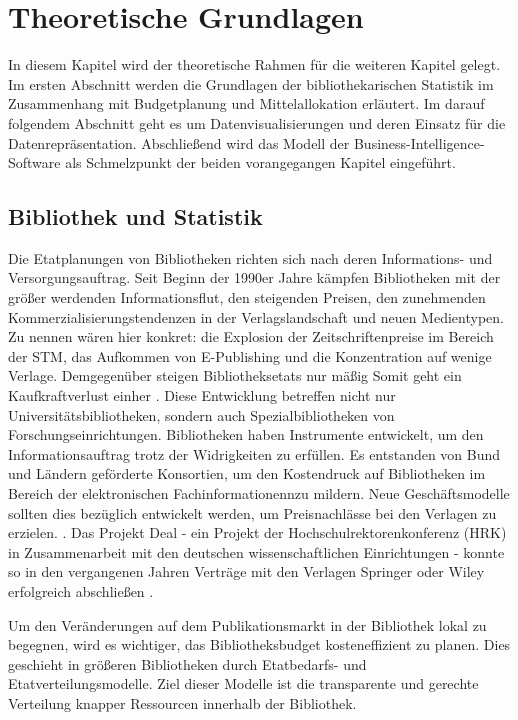 \chapter{Theoretische Grundlagen}
\label{chap:two}
In diesem Kapitel wird der theoretische Rahmen für die weiteren Kapitel gelegt. Im
ersten Abschnitt werden die Grundlagen der bibliothekarischen Statistik im Zusammenhang mit Budgetplanung
und Mittelallokation erläutert. Im darauf folgendem Abschnitt geht es um Datenvisualisierungen und deren Einsatz
für die Datenrepräsentation. Abschließend wird das Modell der Business-Intelligence-Software als Schmelzpunkt der 
beiden vorangegangen Kapitel eingeführt.

\section{Bibliothek und Statistik}
\label{chap:two_one}
Die Etatplanungen von Bibliotheken richten sich nach deren Informations- und Versorgungsauftrag. 
Seit Beginn der 1990er Jahre kämpfen Bibliotheken mit der größer werdenden Informationsflut, den steigenden Preisen, 
den zunehmenden Kommerzialisierungstendenzen in der Verlagslandschaft und neuen Medientypen. 
Zu nennen wären hier konkret: die Explosion der Zeitschriftenpreise im Bereich der \acrfull{STM},
das Aufkommen von E-Publishing und die Konzentration auf wenige Verlage. Demgegenüber steigen Bibliotheksetats nur mäßig
Somit geht ein Kaufkraftverlust einher \cite[vgl.][161]{moravetz-kuhlmann_monika_erwerbungspolitik_2015}.
Diese Entwicklung betreffen nicht nur Universitätsbibliotheken, sondern auch Spezialbibliotheken von Forschungseinrichtungen.
Bibliotheken haben Instrumente entwickelt, um den Informationsauftrag trotz der Widrigkeiten zu erfüllen.
Es entstanden von Bund und Ländern geförderte Konsortien, um den Kostendruck auf Bibliotheken im Bereich der elektronischen
Fachinformationennzu mildern. Neue Geschäftsmodelle sollten dies bezüglich entwickelt werden, um Preisnachlässe bei den Verlagen zu erzielen. 
\cite[vgl.][169 ff.]{moravetz-kuhlmann_monika_erwerbungspolitik_2015}. Das Projekt Deal - ein Projekt der Hochschulrektorenkonferenz (HRK) in Zusammenarbeit mit den
deutschen wissenschaftlichen Einrichtungen - konnte so in den vergangenen Jahren Verträge mit den Verlagen Springer oder Wiley erfolgreich abschließen \cite[vgl.][]{projekt_deal_projekt_2020}.


Um den Veränderungen auf dem Publikationsmarkt in der Bibliothek lokal zu begegnen, wird es wichtiger, das Bibliotheksbudget kosteneffizient zu planen. 
Dies geschieht in größeren Bibliotheken durch Etatbedarfs- und Etatverteilungsmodelle.  
Ziel dieser Modelle ist die transparente und gerechte Verteilung knapper Ressourcen innerhalb der Bibliothek. 

